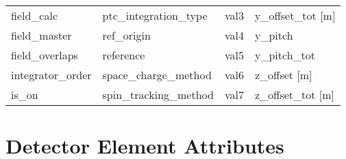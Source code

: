 \begin{tabular}{llll}
field_calc                       & ptc_integration_type             & val3                             & y_offset_tot [m]                 \\
field_master                     & ref_origin                       & val4                             & y_pitch                          \\
field_overlaps                   & reference                        & val5                             & y_pitch_tot                      \\
integrator_order                 & space_charge_method              & val6                             & z_offset [m]                     \\
is_on                            & spin_tracking_method             & val7                             & z_offset_tot [m]                 \\
 \bottomrule
 \end{tabular}
 \vfill
 
 \section{Detector Element Attributes}
 \label{s:list.detector}
 
